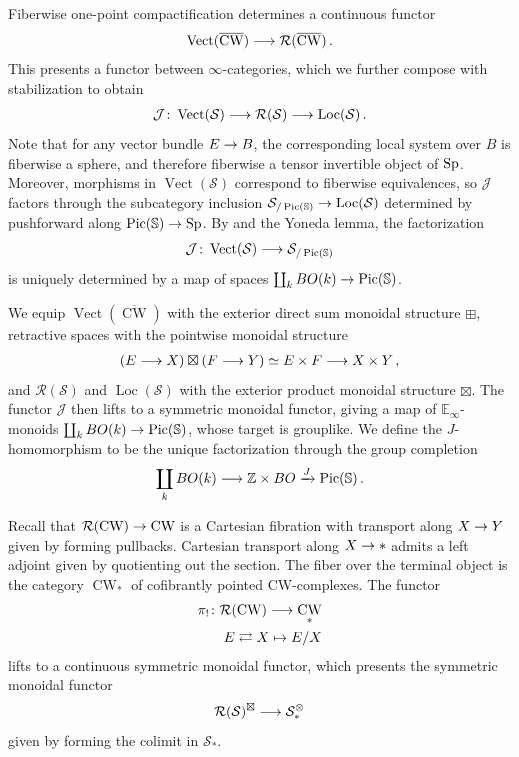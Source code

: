 \documentclass[10pt]{amsart}
\numberwithin{equation}{section}
\theoremstyle{definition}
\DeclareMathOperator{\Pic}{Pic}
\DeclareMathOperator{\Vect}{Vect}
\DeclareMathOperator{\Loc}{Loc}
\DeclareMathOperator{\CW}{CW}
\newcommand{\bE}{\mathbb{E}}
\newcommand{\bS}{\mathbb{S}}
\newcommand{\bZ}{\mathbb{Z}}
\newcommand{\cJ}{\mathcal{J}}
\newcommand{\cS}{\mathcal{S}}
\newcommand{\cR}{\mathcal{R}}
\newcommand{\Sp}{\mathrm{Sp}\vphantom{p}}
\renewcommand{\to}{\mathchoice{\longrightarrow}{\rightarrow}{}{}}
\begin{document}
Fiberwise one-point compactification determines a continuous functor
\begin{align*}
	\Vect(\overline{\CW}) \to \cR(\overline{\CW}) \,.
\end{align*}
This presents a functor between $\infty$-categories, which we further compose with stabilization to obtain
\begin{align*}
	\cJ\colon \Vect(\cS) \to \cR(\cS) \to \Loc(\cS) \,.
\end{align*}
Note that for any vector bundle $E\to B$, the corresponding local system over $B$ is fiberwise a sphere, and therefore fiberwise a tensor invertible object of $\Sp$.
Moreover, morphisms in $\Vect(\cS)$ correspond to fiberwise equivalences, so $\cJ$ factors through the subcategory inclusion $\cS_{/\Pic(\bS)} \to \Loc(\cS)$ determined by pushforward along  $\Pic(\bS) \to \Sp$.
By  and the Yoneda lemma, the factorization
\begin{align*}
	\cJ\colon \Vect(\cS) \to \cS_{/\Pic(\bS)}
\end{align*}
is uniquely determined by a map of spaces $\coprod_{k} BO(k) \to \Pic(\bS)$.

We equip $\Vect(\overline{\CW})$ with the exterior direct sum monoidal structure $\boxplus$, retractive spaces with the pointwise monoidal structure
\begin{align*}
	(E\to X) \boxtimes (F\to Y) \simeq E\times F \to X\times Y \,,
\end{align*}
and $\cR(\cS)$ and $\Loc(\cS)$ with the exterior product monoidal structure $\boxtimes$.
The functor $\cJ$ then lifts to a symmetric monoidal functor, giving a map of $\bE_{\infty}$-monoids $\coprod_{k} BO(k) \to \Pic(\bS)$, whose target is grouplike.
We define the $J$-homomorphism to be the unique factorization through the group completion
\begin{align*}
	\coprod_{k} BO(k) \to \bZ \times BO \xrightarrow{J} \Pic(\bS) \,.
\end{align*}

Recall that $\cR(\CW) \to \CW$ is a Cartesian fibration with transport along $X\to Y$ given by forming pullbacks.
Cartesian transport along $X\to \ast$ admits a left adjoint given by quotienting out the section.
The fiber over the terminal object is the category $\CW_{\ast}$ of cofibrantly pointed CW-complexes.
The functor
\begin{align*}
	\pi_{!}\colon \cR(\CW) \to \CW_{*} \\
	E \rightleftarrows X \mapsto E/X
\end{align*}
lifts to a continuous symmetric monoidal functor, which presents the symmetric monoidal functor
\begin{align*}
	\cR(\cS)^{\boxtimes} \to \cS_{*}^{\otimes}
\end{align*}
given by forming the colimit in $\cS_{*}$.
\end{document}
